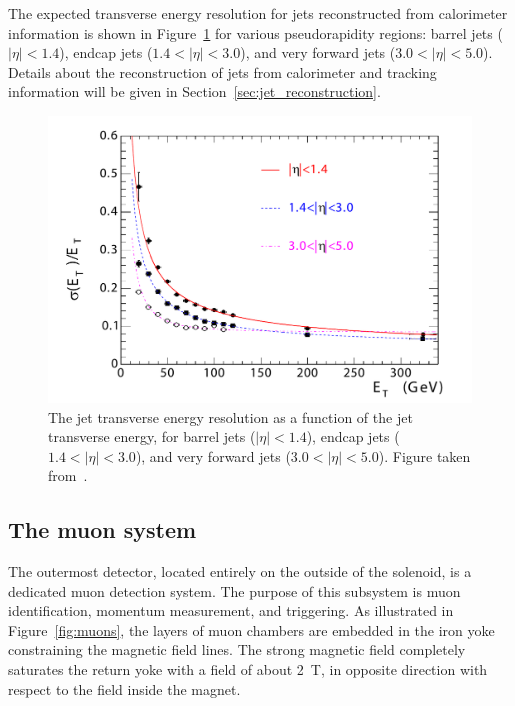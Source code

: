 The expected transverse energy resolution for jets reconstructed from calorimeter information is shown in Figure~\ref{fig:JER} for various pseudorapidity regions: barrel jets ($|\eta| < 1.4$), endcap jets ($1.4 < |\eta| < 3.0$), and very forward jets ($3.0 < |\eta| < 5.0$). Details about the reconstruction of jets from calorimeter and tracking information will be given in Section~\ref{sec:jet_reconstruction}.

\begin{figure}[ht]
  \centering
 \includegraphics[width=.65\textwidth]{JER}
 \caption{The jet transverse energy resolution as a function of the jet transverse energy, for barrel jets ($|\eta| < 1.4$), endcap jets ($1.4 < |\eta| < 3.0$), and very forward jets ($3.0 < |\eta| < 5.0$). Figure taken from~\cite{Chatrchyan:2008aa}.}
 \label{fig:JER}
\end{figure}

\subsection{The muon system}

The outermost detector, located entirely on the outside of the solenoid, is a dedicated muon detection system. The purpose of this subsystem is muon identification, momentum measurement, and triggering. As illustrated in Figure~\ref{fig:muons}, the layers of muon chambers are embedded in the iron yoke constraining the magnetic field lines. The strong magnetic field completely saturates the return yoke with a field of about \SI{2}{T}, in opposite direction with respect to the field inside the magnet.

